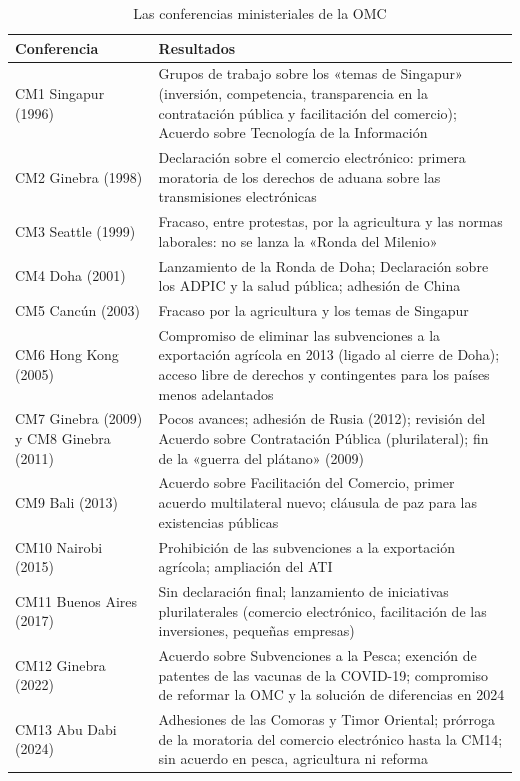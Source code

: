 \documentclass[11pt]{article}
\begin{document}
\begin{table}[H]
\centering
\caption{Las conferencias ministeriales de la OMC}\label{tab:conferencias}
\footnotesize
\begin{tabular}{>{\raggedright\arraybackslash}m{3.2cm}>{\raggedright\arraybackslash}m{11.4cm}}
\toprule
\rowcolor{tceeazulpalido} \textbf{Conferencia} & \textbf{Resultados}\\
\midrule
CM1 Singapur (1996) & Grupos de trabajo sobre los «temas de Singapur» (inversión, competencia, transparencia en la contratación pública y facilitación del comercio); Acuerdo sobre Tecnología de la Información\\
CM2 Ginebra (1998) & Declaración sobre el comercio electrónico: primera moratoria de los derechos de aduana sobre las transmisiones electrónicas\\
CM3 Seattle (1999) & Fracaso, entre protestas, por la agricultura y las normas laborales: no se lanza la «Ronda del Milenio»\\
CM4 Doha (2001) & Lanzamiento de la Ronda de Doha; Declaración sobre los ADPIC y la salud pública; adhesión de China\\
CM5 Cancún (2003) & Fracaso por la agricultura y los temas de Singapur\\
CM6 Hong Kong (2005) & Compromiso de eliminar las subvenciones a la exportación agrícola en 2013 (ligado al cierre de Doha); acceso libre de derechos y contingentes para los países menos adelantados\\
CM7 Ginebra (2009) y CM8 Ginebra (2011) & Pocos avances; adhesión de Rusia (2012); revisión del Acuerdo sobre Contratación Pública (plurilateral); fin de la «guerra del plátano» (2009)\\
\rowcolor{tceesalvia}CM9 Bali (2013) & Acuerdo sobre Facilitación del Comercio, primer acuerdo multilateral nuevo; cláusula de paz para las existencias públicas\\
\rowcolor{tceesalvia}CM10 Nairobi (2015) & Prohibición de las subvenciones a la exportación agrícola; ampliación del ATI\\
CM11 Buenos Aires (2017) & Sin declaración final; lanzamiento de iniciativas plurilaterales (comercio electrónico, facilitación de las inversiones, pequeñas empresas)\\
\rowcolor{tceesalvia}CM12 Ginebra (2022) & Acuerdo sobre Subvenciones a la Pesca; exención de patentes de las vacunas de la COVID-19; compromiso de reformar la OMC y la solución de diferencias en 2024\\
CM13 Abu Dabi (2024) & Adhesiones de las Comoras y Timor Oriental; prórroga de la moratoria del comercio electrónico hasta la CM14; sin acuerdo en pesca, agricultura ni reforma\\

\end{tabular}
\end{table}
\end{document}
